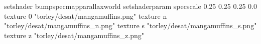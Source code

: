 setshader bumpspecmapparallaxworld
setshaderparam specscale 0.25 0.25 0.25 0.0
texture 0 "torley/desat/mangamuffins.png"
texture n "torley/desat/mangamuffins_n.png"
texture s "torley/desat/mangamuffins_s.png"
texture z "torley/desat/mangamuffins_z.png"

